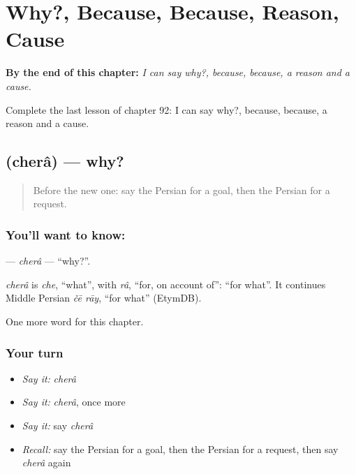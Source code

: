 
\chapter{Why?, Because, Because, Reason, Cause}
\label{ch:fa-why-because-because-reason-cause}

\begin{chapteropening}
\textbf{By the end of this chapter:} \emph{I can say why?, because, because, a reason and a cause.}

Complete the last lesson of chapter 92: I can say why?, because, because, a reason and a cause.
\end{chapteropening}

\section[\texorpdfstring{\fa{چرا} (cherâ)}{چرا (cherâ)}]{ (cherâ) — why?}

\label{lesson:FA-C92-chera}



\begin{quote}
Before the new one: say the Persian for a goal, then the Persian for a request.
\end{quote}

\subsection*{You'll want to know: }
\textbf{} — \emph{cherâ} — \textquotedblleft{}why?\textquotedblright{}.

\begin{cousinweb}
\emph{cherâ} is \emph{che}, \textquotedblleft{}what\textquotedblright{}, with \emph{râ}, \textquotedblleft{}for, on account of\textquotedblright{}: \textquotedblleft{}for what\textquotedblright{}. It continues Middle Persian \emph{čē rāy}, \textquotedblleft{}for what\textquotedblright{} (EtymDB).
\end{cousinweb}

\begin{grammarlens}[title={What you've built}]
One more word for this chapter.
\end{grammarlens}

\subsection*{Your turn}
\begin{itemize}
\raggedright
  \item \emph{Say it:} \emph{cherâ}
  \item \emph{Say it:} \emph{cherâ}, once more
  \item \emph{Say it:} say \emph{cherâ}
  \item \emph{Recall:} say the Persian for a goal, then the Persian for a request, then say \emph{cherâ} again
\end{itemize}

